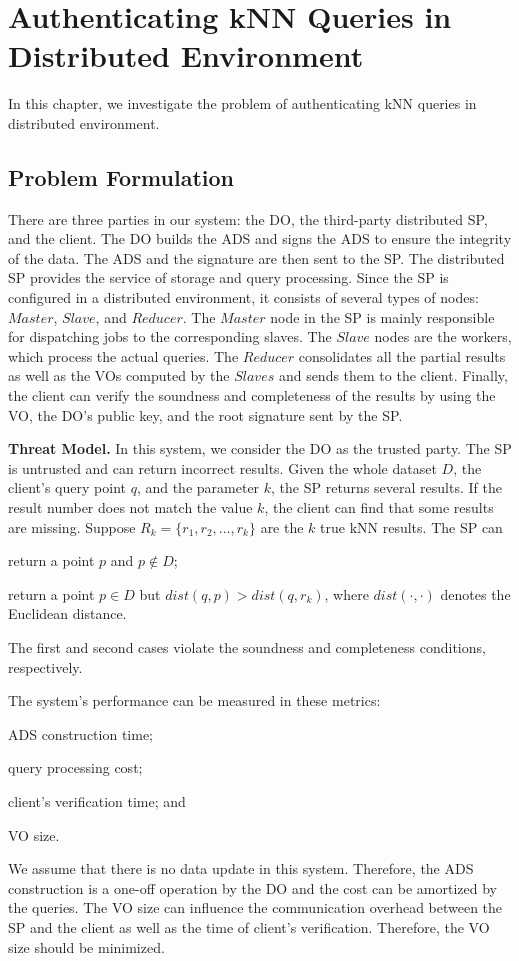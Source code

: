 \chapter{Authenticating {kNN} Queries in Distributed Environment}\label{chap:knn}

In this chapter, we investigate the problem of authenticating {kNN} queries in distributed environment.

\section{Problem Formulation}\label{sec:knn:problem}

There are three parties in our system: the DO, the third-party distributed SP, and the client. The DO builds the ADS and signs the ADS to ensure the integrity of the data. The ADS and the signature are then sent to the SP\@. The distributed SP provides the service of storage and query processing. Since the SP is configured in a distributed environment, it consists of several types of nodes: $Master$, $Slave$, and $Reducer$. The $Master$ node in the SP is mainly responsible for dispatching jobs to the corresponding slaves. The $Slave$ nodes are the workers, which process the actual queries. The $Reducer$ consolidates all the partial results as well as the VOs computed by the $Slaves$ and sends them to the client. Finally, the client can verify the soundness and completeness of the results by using the VO, the DO's public key, and the root signature sent by the SP\@.

\textbf{Threat Model.}
In this system, we consider the DO as the trusted party. The SP is untrusted and can return incorrect results. Given the whole dataset $D$, the client's query point $q$, and the parameter $k$, the SP returns several results. If the result number does not match the value $k$, the client can find that some results are missing. Suppose $R_{k}=\{r_{1},r_{2},\dots,r_{k}\}$ are the $k$ true kNN results. The SP can
\begin{inlineenum}
\item return a point $p$ and $p \notin D$;
\item return a point $p \in D$ but $dist(q,p) > dist(q,r_{k})$, where $dist(\cdot,\cdot)$ denotes the Euclidean distance.
\end{inlineenum}
The first and second cases violate the soundness and completeness conditions, respectively.

The system's performance can be measured in these metrics:
\begin{inlineenum}
\item ADS construction time;
\item query processing cost;
\item client's verification time; and
\item VO size.
\end{inlineenum}
We assume that there is no data update in this system. Therefore, the ADS construction is a one-off operation by the DO and the cost can be amortized by the queries. The VO size can influence the communication overhead between the SP and the client as well as the time of client's verification. Therefore, the VO size should be minimized.

